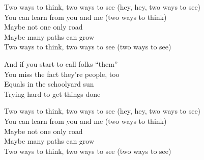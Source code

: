 \begin{lyrics}
Two ways to think, two ways to see
(hey, hey, two ways to see)\\
You can learn from you and me
(two ways to think)\\
Maybe not one only road\\
Maybe many paths can grow\\
Two ways to think, two ways to see
(two ways to see)

And if you start to call folks “them”\\
You miss the fact they’re people, too\\
Equals in the schoolyard sun\\
Trying hard to get things done

Two ways to think, two ways to see
(hey, hey, two ways to see)\\
You can learn from you and me
(two ways to think)\\
Maybe not one only road\\
Maybe many paths can grow\\
Two ways to think, two ways to see
(two ways to see)
\end{lyrics}

